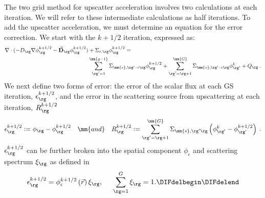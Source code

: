  The two grid method for upscatter acceleration involves two calculations at each iteration. We will refer to these intermediate calculations as half iterations. To add the upscatter acceleration, we must determine an equation for the error correction. We start with the $k + 1/2$ iteration, expressed as:
  \begin{equation}
  \begin{split}
  \nabla\cdot(-D_\rg \nabla \phi_\rg^{k+1/2} - \vec{\bf D}_\rg \phi_\rg^{k+1/2}) &+ \Sigma_{r,\rg} \phi_\rg^{k+1/2} =  \\ &\sum\limits_{\substack{\rg'=1}}^\mm{g-1} \Sigma_{\mm{s},\rg' \to\rg}\phi_{\rg}^{k+1/2} + \sum\limits_{\substack{\rg'=\rg+1}}^\mm{G} \Sigma_{\mm{s},\rg' \to\rg}\phi_{\rg'}^{k} + Q_\rg\:. 
  \end{split}
  \label{eq:k1/2}
  \end{equation}
  We next define two forms of error: the error of the scalar flux at each GS iteration, $\epsilon_\rg^{k+1/2}$, and the error in the scattering source from upscattering at each iteration, $R_\rg^{k+1/2}$
  \begin{equation}
  \epsilon_\rg^{k+1/2} := \phi_\rg - \phi_\rg^{k + 1/2} \quad \mm{and} \quad R_\rg^{k+1/2} := \sum\limits_{\rg'=\rg+1}^\mm{G} \Sigma_{\mm{s},\rg' \rg}\left(\phi_{\rg'}^k - \phi_{\rg'}^{k + 1/2}\right)\:.
  \end{equation}
  $\epsilon_\rg^{k + 1/2}$ can be further broken into the spatial component $\phi_{\epsilon}$ and scattering spectrum $\xi_\rg$ as defined in \DIFdelbegin {}\DIFdelend \DIFaddbegin {}\DIFaddend \begin{equation}
  \epsilon_\rg^{k+1/2} = \phi_{\epsilon}^{k+1/2}\left(\vec{r}\right)\xi_\rg, \hspace{5mm} \sum\limits_{\rg=1}^G \xi_\rg = 1.
  \DIFdelbegin %
\DIFdelend \end{equation}

